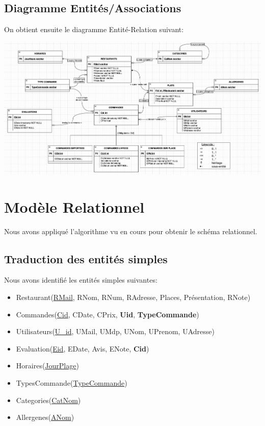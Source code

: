 \documentclass[10pt, a4paper]{article}
\begin{document}
\begin{landscape}
    \subsection{Diagramme Entités/Associations}
    On obtient ensuite le diagramme Entité-Relation suivant:
    \begin{center}
        \includegraphics[scale=0.7]{Diagramme_entite_relation.png}\\
    \end{center}

\end{landscape}
\section{Modèle Relationnel}

Nous avons appliqué l'algorithme vu en cours pour obtenir le schéma relationnel.

\subsection{Traduction des entités simples}

Nous avons identifié les entités simples suivantes:

\begin{itemize}
    \item Restaurant\@(\underline{RMail}, RNom, RNum, RAdresse, Places, Présentation, RNote)
    \item Commandes\@(\underline{Cid}, CDate, CPrix, \textbf{Uid}, \textbf{TypeCommande})
    \item Utilisateurs\@(\underline{U\_id}, UMail, UMdp, UNom, UPrenom, UAdresse)
    \item Evaluation\@(\underline{Eid}, EDate, Avis, ENote, \textbf{Cid})
    \item Horaires\@(\underline{JourPlage})
    \item TypesCommande\@(\underline{TypeCommande})
    \item Categories\@(\underline{CatNom})
    \item Allergenes\@(\underline{ANom})
\end{itemize}
\end{document}

